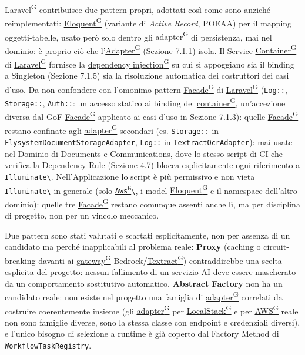 \documentclass[a4paper,12pt]{article}
\providecommand{\glslink}[2]{\href{https://alittlebyte-19.github.io/Documentazione/glossario.html\#gls-#1}{\underline{#2}\textsuperscript{\scriptsize G}}}
\begin{document}
\begin{sloppypar}
\glslink{laravel}{Laravel} contribuisce due pattern propri, adottati così come sono anziché reimplementati: \glslink{eloquent}{Eloquent} (variante di \textit{Active Record}, POEAA) per il mapping oggetti-tabelle, usato però solo dentro gli \glslink{adapter}{adapter} di persistenza, mai nel dominio: è proprio ciò che l'\glslink{adapter}{Adapter} (Sezione 7.1.1) isola. Il Service \glslink{container}{Container} di \glslink{laravel}{Laravel} fornisce la \glslink{dependency-injection}{dependency injection} su cui si appoggiano sia il binding a Singleton (Sezione 7.1.5) sia la risoluzione automatica dei costruttori dei casi d'uso. Da non confondere con l'omonimo pattern \glslink{facade}{Facade} di \glslink{laravel}{Laravel} (\texttt{Log::}, \texttt{Storage::}, \texttt{Auth::}: un accesso statico ai binding del \glslink{container}{container}, un'accezione diversa dal GoF \glslink{facade}{Facade} applicato ai casi d'uso in Sezione 7.1.3): quelle \glslink{facade}{Facade} restano confinate agli \glslink{adapter}{adapter} secondari (es. \texttt{Storage::} in \texttt{FlysystemDocumentStorageAdapter}, \texttt{Log::} in \texttt{TextractOcrAdapter}): mai usate nel Dominio di Documents e Communications, dove lo stesso script di CI che verifica la Dependency Rule (Sezione 4.7) blocca esplicitamente ogni riferimento a \texttt{Illuminate\textbackslash*}. Nell'Applicazione lo script è più permissivo e non vieta \texttt{Illuminate\textbackslash*} in generale (solo \texttt{\glslink{aws}{Aws}\textbackslash*}, i model \glslink{eloquent}{Eloquent} e il namespace dell'altro dominio): quelle tre \glslink{facade}{Facade} restano comunque assenti anche lì, ma per disciplina di progetto, non per un vincolo meccanico.

Due pattern sono stati valutati e scartati esplicitamente, non per assenza di un candidato ma perché inapplicabili al problema reale: \textbf{Proxy} (caching o circuit-breaking davanti ai \glslink{gateway}{gateway} Bedrock/\glslink{textract}{Textract}) contraddirebbe una scelta esplicita del progetto: nessun fallimento di un servizio AI deve essere mascherato da un comportamento sostitutivo automatico. \textbf{Abstract Factory} non ha un candidato reale: non esiste nel progetto una famiglia di \glslink{adapter}{adapter} correlati da costruire coerentemente insieme (gli \glslink{adapter}{adapter} per \glslink{localstack}{LocalStack} e per \glslink{aws}{AWS} reale non sono famiglie diverse, sono la stessa classe con endpoint e credenziali diversi), e l'unico bisogno di selezione a runtime è già coperto dal Factory Method di \texttt{WorkflowTaskRegistry}.


\end{sloppypar}
\end{document}
